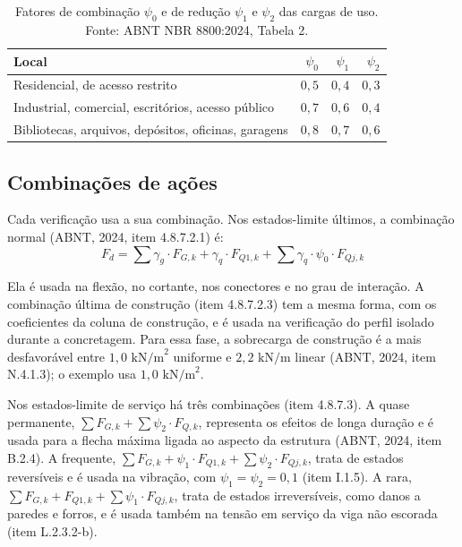 \documentclass[11pt,a4paper]{article}
\begin{document}
\begin{table}[!htbp]
  \centering
  \caption{Fatores de combinação $\psi_0$ e de redução $\psi_1$ e $\psi_2$ das cargas de uso. Fonte: ABNT NBR 8800:2024, Tabela 2.}
  \label{tab:psi}
  \small
  \begin{tabularx}{\linewidth}{Xrrr}
    \toprule
    \textbf{Local} & $\psi_0$ & $\psi_1$ & $\psi_2$ \\
    \midrule
    Residencial, de acesso restrito & $0{,}5$ & $0{,}4$ & $0{,}3$ \\
    Industrial, comercial, escritórios, acesso público & $0{,}7$ & $0{,}6$ & $0{,}4$ \\
    Bibliotecas, arquivos, depósitos, oficinas, garagens & $0{,}8$ & $0{,}7$ & $0{,}6$ \\
    \bottomrule
  \end{tabularx}
\end{table}

\subsection{Combinações de ações}

Cada verificação usa a sua combinação. Nos estados-limite últimos, a combinação normal (ABNT, 2024, item 4.8.7.2.1) é:
\begin{equation}
  F_d = \sum \gamma_g\cdot F_{G,k} + \gamma_q\cdot F_{Q1,k} + \sum \gamma_q\cdot \psi_0\cdot F_{Qj,k}
  \label{eq:comb-normal}
\end{equation}

Ela é usada na flexão, no cortante, nos conectores e no grau de interação. A combinação última de construção (item 4.8.7.2.3) tem a mesma forma, com os coeficientes da coluna de construção, e é usada na verificação do perfil isolado durante a concretagem. Para essa fase, a sobrecarga de construção é a mais desfavorável entre $1{,}0\text{ kN/m}^2$ uniforme e $2{,}2\text{ kN/m}$ linear (ABNT, 2024, item N.4.1.3); o exemplo usa $1{,}0\text{ kN/m}^2$.

Nos estados-limite de serviço há três combinações (item 4.8.7.3). A quase permanente, $\sum F_{G,k} + \sum \psi_2\cdot F_{Q,k}$, representa os efeitos de longa duração e é usada para a flecha máxima ligada ao aspecto da estrutura (ABNT, 2024, item B.2.4). A frequente, $\sum F_{G,k} + \psi_1\cdot F_{Q1,k} + \sum \psi_2\cdot F_{Qj,k}$, trata de estados reversíveis e é usada na vibração, com $\psi_1 = \psi_2 = 0{,}1$ (item I.1.5). A rara, $\sum F_{G,k} + F_{Q1,k} + \sum \psi_1\cdot F_{Qj,k}$, trata de estados irreversíveis, como danos a paredes e forros, e é usada também na tensão em serviço da viga não escorada (item L.2.3.2-b).
\end{document}
